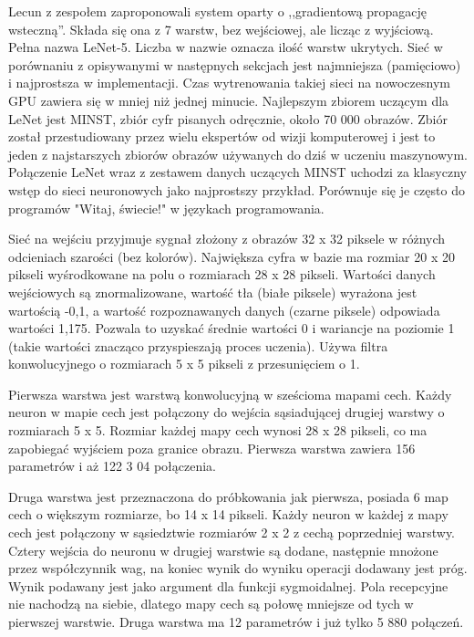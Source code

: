 \documentclass[12pt,a4paper,twoside,titlepage,openright]{book}
\begin{document}
\begin{itemize}
\begin{itemize}
Lecun z zespołem zaproponowali system oparty o ,,gradientową propagację wsteczną''. Składa się ona z 7 warstw, bez wejściowej, ale licząc z wyjściową. Pełna nazwa LeNet-5. Liczba w nazwie oznacza ilość warstw ukrytych. Sieć w porównaniu z opisywanymi w następnych sekcjach jest najmniejsza (pamięciowo) i najprostsza w implementacji. Czas wytrenowania takiej sieci na nowoczesnym GPU zawiera się w mniej niż jednej minucie. Najlepszym zbiorem uczącym dla LeNet jest MINST, zbiór cyfr pisanych odręcznie, około 70 000 obrazów. Zbiór został przestudiowany przez wielu ekspertów od wizji komputerowej i jest to jeden z najstarszych zbiorów obrazów używanych do dziś w uczeniu maszynowym. Połączenie LeNet wraz z zestawem danych uczących MINST uchodzi za klasyczny wstęp do sieci neuronowych jako najprostszy przykład. Porównuje się je często do programów "Witaj, świecie!" w językach programowania.

Sieć na wejściu przyjmuje sygnał złożony z obrazów 32 x 32 piksele w różnych odcieniach szarości (bez kolorów). Największa cyfra w bazie ma rozmiar 20 x 20 pikseli wyśrodkowane na polu o rozmiarach 28 x 28 pikseli. Wartości danych wejściowych są znormalizowane, wartość tła (białe piksele) wyrażona jest wartością -0,1, a wartość rozpoznawanych danych (czarne piksele) odpowiada wartości 1,175. Pozwala to uzyskać średnie wartości 0 i wariancje na poziomie 1 (takie wartości znacząco przyspieszają proces uczenia). Używa filtra konwolucyjnego o rozmiarach 5 x 5 pikseli z przesunięciem o 1.

Pierwsza warstwa jest warstwą konwolucyjną w sześcioma mapami cech. Każdy neuron w mapie cech jest połączony do wejścia sąsiadującej drugiej warstwy o rozmiarach 5 x 5. Rozmiar każdej mapy cech wynosi 28 x 28 pikseli, co ma zapobiegać wyjściem poza granice obrazu. Pierwsza warstwa zawiera 156 parametrów i aż 122 3 04 połączenia.

Druga warstwa jest przeznaczona do próbkowania jak pierwsza, posiada 6 map cech o większym rozmiarze, bo 14 x 14 pikseli. Każdy neuron w każdej z mapy cech jest połączony w sąsiedztwie rozmiarów 2 x 2 z cechą poprzedniej warstwy. Cztery wejścia do neuronu w drugiej warstwie są dodane, następnie mnożone przez współczynnik wag, na koniec wynik do wyniku operacji dodawany jest próg. Wynik podawany jest jako argument dla funkcji sygmoidalnej. Pola recepcyjne nie nachodzą na siebie, dlatego mapy cech są połowę mniejsze od tych w pierwszej warstwie. Druga warstwa ma 12 parametrów i już tylko 5 880 połączeń.


\end{itemize}
\end{itemize}
\end{document}
